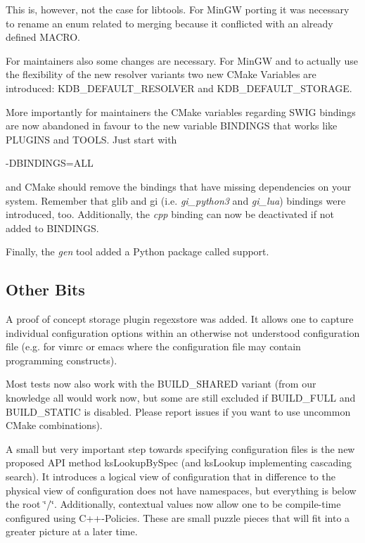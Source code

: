 This is, however, not the case for libtools. For Min\+G\+W porting it was necessary to rename an enum related to merging because it conflicted with an already defined M\+A\+C\+R\+O.

For maintainers also some changes are necessary. For Min\+G\+W and to actually use the flexibility of the new resolver variants two new C\+Make Variables are introduced\+: K\+D\+B\+\_\+\+D\+E\+F\+A\+U\+L\+T\+\_\+\+R\+E\+S\+O\+L\+V\+E\+R and K\+D\+B\+\_\+\+D\+E\+F\+A\+U\+L\+T\+\_\+\+S\+T\+O\+R\+A\+G\+E.

More importantly for maintainers the C\+Make variables regarding S\+W\+I\+G bindings are now abandoned in favour to the new variable B\+I\+N\+D\+I\+N\+G\+S that works like P\+L\+U\+G\+I\+N\+S and T\+O\+O\+L\+S. Just start with \begin{DoxyVerb}    -DBINDINGS=ALL
\end{DoxyVerb}


and C\+Make should remove the bindings that have missing dependencies on your system. Remember that glib and gi (i.\+e. {\itshape gi\+\_\+python3} and {\itshape gi\+\_\+lua}) bindings were introduced, too. Additionally, the {\itshape cpp} binding can now be deactivated if not added to B\+I\+N\+D\+I\+N\+G\+S.

Finally, the {\itshape gen} tool added a Python package called {\ttfamily support}.

\subsection*{Other Bits}

A proof of concept storage plugin {\ttfamily regexstore} was added. It allows one to capture individual configuration options within an otherwise not understood configuration file (e.\+g. for vimrc or emacs where the configuration file may contain programming constructs).

Most tests now also work with the B\+U\+I\+L\+D\+\_\+\+S\+H\+A\+R\+E\+D variant (from our knowledge all would work now, but some are still excluded if B\+U\+I\+L\+D\+\_\+\+F\+U\+L\+L and B\+U\+I\+L\+D\+\_\+\+S\+T\+A\+T\+I\+C is disabled. Please report issues if you want to use uncommon C\+Make combinations).

A small but very important step towards specifying configuration files is the new proposed A\+P\+I method ks\+Lookup\+By\+Spec (and ks\+Lookup implementing cascading search). It introduces a {\ttfamily logical view} of configuration that in difference to the {\ttfamily physical view} of configuration does not have namespaces, but everything is below the root \char`\"{}/\char`\"{}. Additionally, contextual values now allow one to be compile-\/time configured using C++-\/\+Policies. These are small puzzle pieces that will fit into a greater picture at a later time.

